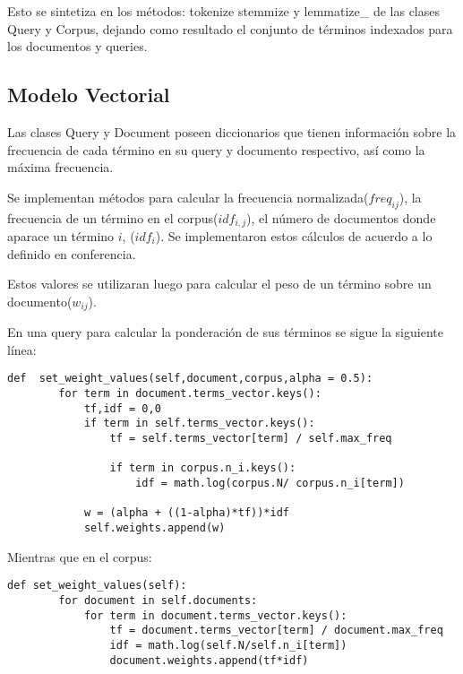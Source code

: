 \documentclass[runningheads,a4paper]{llncs}
\begin{document}
Esto se sintetiza en los m\'etodos: \textsf{tokenize} \textsf{stemmize} y \textsf{lemmatize\_} de las clases  \textsf{Query} y \textsf{Corpus}, dejando como resultado el conjunto de t\'erminos indexados para los documentos y queries.

\subsection{Modelo Vectorial}

Las clases  \textsf{Query} y \textsf{Document} poseen diccionarios que tienen informaci\'on sobre la frecuencia de cada t\'ermino en su query y documento respectivo, as\'i como la m\'axima frecuencia. 

Se implementan m\'etodos para calcular la frecuencia normalizada($freq_{ij}$), la frecuencia de un t\'ermino en el corpus($idf_{i,j}$), el n\'umero de documentos donde aparace un t\'ermino $i$, ($idf_i$). Se implementaron estos c\'alculos de acuerdo a lo definido en conferencia.

Estos valores se utilizaran luego para calcular el peso de un t\'ermino sobre un documento($w_{ij}$). 
 
En una query para calcular la ponderaci\'on de sus t\'erminos se sigue la siguiente l\'inea:
 
\begin{lstlisting}
def  set_weight_values(self,document,corpus,alpha = 0.5):
        for term in document.terms_vector.keys():
            tf,idf = 0,0
            if term in self.terms_vector.keys():
                tf = self.terms_vector[term] / self.max_freq
                
                if term in corpus.n_i.keys():
                    idf = math.log(corpus.N/ corpus.n_i[term])
            
            w = (alpha + ((1-alpha)*tf))*idf
            self.weights.append(w)
\end{lstlisting}


Mientras que en el corpus:

\begin{lstlisting}
def set_weight_values(self):
        for document in self.documents:
            for term in document.terms_vector.keys():
                tf = document.terms_vector[term] / document.max_freq
                idf = math.log(self.N/self.n_i[term])
                document.weights.append(tf*idf)
\end{lstlisting}
\end{document}
